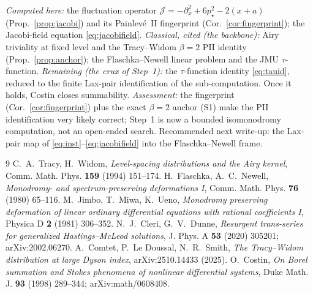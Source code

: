 \documentclass[11pt,reqno]{amsart}
\theoremstyle{plain}
\theoremstyle{remark}
\newcommand{\pinst}{p_\star}
\begin{document}
\emph{Computed here:} the fluctuation operator $\mathcal J=-\partial_x^2+6\pinst^2-2(x+a)$
(Prop.~\ref{prop:jacobi}) and its Painlev\'e~II fingerprint (Cor.~\ref{cor:fingerprint});
the Jacobi-field equation \eqref{eq:jacobifield}.
\emph{Classical, cited (the backbone):} Airy triviality at fixed level and the Tracy--Widom
$\beta=2$ PII identity (Prop.~\ref{prop:anchor}); the Flaschka--Newell linear problem and the
JMU $\tau$-function.
\emph{Remaining (the crux of Step~1):} the $\tau$-function identity \eqref{eq:tauid}, reduced to the
finite Lax-pair identification of the sub-computation. Once it holds, Costin closes summability.
\emph{Assessment:} the fingerprint (Cor.~\ref{cor:fingerprint}) plus the exact $\beta=2$ anchor
(S1) make the PII identification very likely correct; Step~1 is now a bounded isomonodromy
computation, not an open-ended search. Recommended next write-up: the Lax-pair map of
\eqref{eq:inst}--\eqref{eq:jacobifield} into the Flaschka--Newell frame.

\begin{thebibliography}{9}
 C.~A.~Tracy, H.~Widom, \emph{Level-spacing distributions and the Airy kernel},
Comm. Math. Phys. \textbf{159} (1994) 151--174.
 H.~Flaschka, A.~C.~Newell, \emph{Monodromy- and spectrum-preserving deformations
I}, Comm. Math. Phys. \textbf{76} (1980) 65--116.
 M.~Jimbo, T.~Miwa, K.~Ueno, \emph{Monodromy preserving deformation of linear
ordinary differential equations with rational coefficients I}, Physica D \textbf{2} (1981)
306--352.
 N.~J.~Cleri, G.~V.~Dunne, \emph{Resurgent trans-series for generalized
Hastings--McLeod solutions}, J. Phys. A \textbf{53} (2020) 305201; arXiv:2002.06270.
 A.~Comtet, P.~Le Doussal, N.~R.~Smith, \emph{The Tracy--Widom distribution at large
Dyson index}, arXiv:2510.14433 (2025).
 O.~Costin, \emph{On Borel summation and Stokes phenomena of nonlinear
differential systems}, Duke Math. J. \textbf{93} (1998) 289--344; arXiv:math/0608408.
\end{thebibliography}
\end{document}
